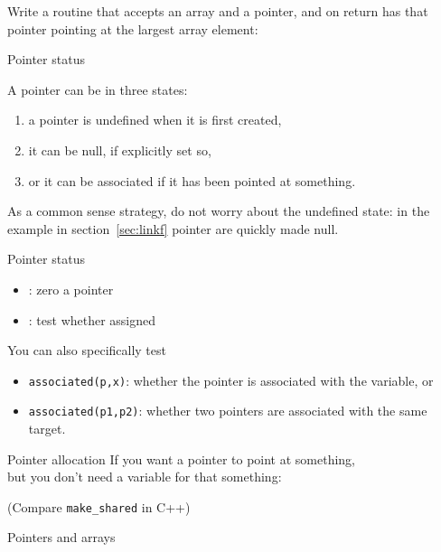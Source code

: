 \begin{exercise}
  \label{ex:fpoint-fun}
  Write a routine that accepts an array and a pointer, and on return
  has that pointer pointing at the largest array element:
\end{exercise}

 {Pointer status}

A pointer can be in three states:
\begin{enumerate}
\item a pointer is undefined when it is first created,
\item it can be null, if explicitly set so,
\item or it can be associated if it has been pointed at something.
\end{enumerate}

As a common sense strategy, do not worry about the undefined state:
in the example in section~\ref{sec:linkf} pointer are quickly made null.

\begin{block}{Pointer status}
  \label{sl:fpoint-stat}
  \begin{itemize}
  \item {}: zero a pointer
  \item {}: test whether assigned
  \end{itemize}  
\end{block}

You can also specifically test
\begin{itemize}
\item \lstinline+associated(p,x)+:
  whether the pointer is associated with the variable, or
\item \lstinline+associated(p1,p2)+:
  whether two pointers are associated with the same target.
\end{itemize}

\begin{block}{Pointer allocation}
  \label{sl:fpoint-alloc}
  If you want a pointer to point at something,\\
  but you don't need a variable for that something:

  (Compare \lstinline+make_shared+ in C++)
\end{block}

 {Pointers and arrays}

